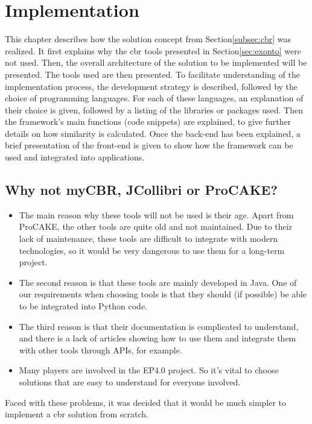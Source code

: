 \section{Implementation\label{sec:implementation}}
This chapter describes how the solution concept from Section\ref{subsec:cbr} was realized. It first explains why the \acrshort{cbr} tools presented in Section\ref{sec:exonto} were not used. Then, the overall architecture of the solution to be implemented will be presented. The tools used are then presented. To facilitate understanding of the implementation process, the development strategy is described, followed by the choice of programming languages. For each of these languages, an explanation of their choice is given, followed by a listing of the libraries or packages used. Then the framework's main functions (code snippets) are explained, to give further details on how similarity is calculated. Once the back-end has been explained, a brief presentation of the front-end is given to show how the framework can be used and integrated into applications.

\subsection{Why not myCBR, JCollibri or ProCAKE?\label{sec:whyNot}}
\begin{itemize}
    \item The main reason why these tools will not be used is their age. Apart from ProCAKE, the other tools are quite old and not maintained. Due to their lack of maintenance, these tools are difficult to integrate with modern technologies, so it would be very dangerous to use them for a long-term project. 
    \item The second reason is that these tools are mainly developed in Java. One of our requirements when choosing tools is that they should (if possible) be able to be integrated into Python code.
    \item The third reason is that their documentation is complicated to understand, and there is a lack of articles showing how to use them and integrate them with other tools through APIs, for example. 
    \item Many players are involved in the EP4.0 project. So it's vital to choose solutions that are easy to understand for everyone involved.\\
\end{itemize}
Faced with these problems, it was decided that it would be much simpler to implement a \acrshort{cbr} solution from scratch.


